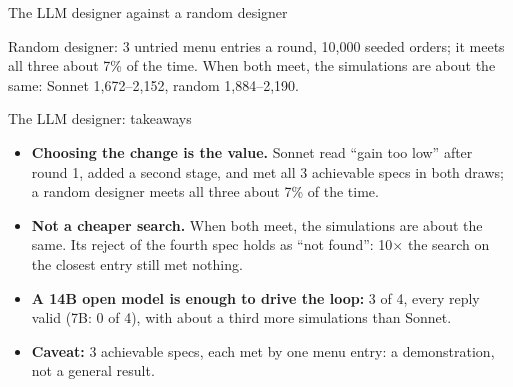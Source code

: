 \begin{frame}{The LLM designer against a random designer}
  \centering

  \vspace{2mm}
  \begin{minipage}{0.92\linewidth}\footnotesize
    Random designer: 3 untried menu entries a round, 10,000 seeded orders; it meets all three about 7\% of the time.
    When both meet, the simulations are about the same: Sonnet 1,672--2,152, random 1,884--2,190.
  \end{minipage}
\end{frame}

\begin{frame}{The LLM designer: takeaways}
  \begin{itemize}
    \item \textbf{Choosing the change is the value.} Sonnet read ``gain too low'' after round 1, added a second stage,
      and met all 3 achievable specs in both draws; a random designer meets all three about 7\% of the time.
    \item \textbf{Not a cheaper search.} When both meet, the simulations are about the same. Its reject of the
      fourth spec holds as ``not found'': 10$\times$ the search on the closest entry still met nothing.
    \item \textbf{A 14B open model is enough to drive the loop:} 3 of 4, every reply valid (7B: 0 of 4), with about a
      third more simulations than Sonnet.
    \item \textbf{Caveat:} 3 achievable specs, each met by one menu entry: a demonstration, not a general result.
  \end{itemize}
\end{frame}

